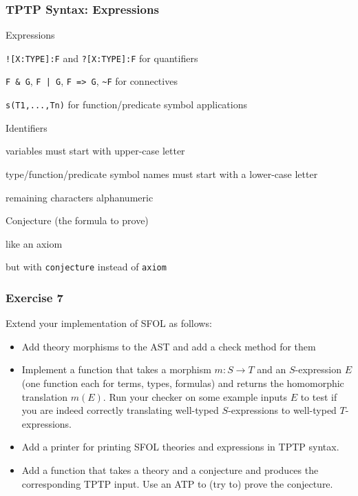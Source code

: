 \begin{frame}[fragile]\frametitle{TPTP Syntax: Expressions}
\begin{blockitems}{Expressions}
\item \lstinline|![X:TYPE]:F| and \lstinline|?[X:TYPE]:F| for quantifiers
\item \lstinline!F & G!, \lstinline!F | G!, \lstinline!F => G!, \lstinline!~F! for connectives
\item \lstinline|s(T1,...,Tn)| for function/predicate symbol applications
\end{blockitems}

\begin{blockitems}{Identifiers}
\item variables must start with upper-case letter
\item type/function/predicate symbol names must start with a lower-case letter
\item remaining characters alphanumeric
\end{blockitems}

\begin{blockitems}{Conjecture (the formula to prove)}
\item like an axiom
\item but with \lstinline|conjecture| instead of \lstinline|axiom|
\end{blockitems}
\end{frame}

\begin{frame}\frametitle{Exercise 7}
Extend your implementation of SFOL as follows:
\begin{itemize}
\item Add theory morphisms to the AST and add a check method for them
\item Implement a function that takes a morphism $m:S\to T$ and an $S$-expression $E$ (one function each for terms, types, formulas) and returns the homomorphic translation $m(E)$.
Run your checker on some example inputs $E$ to test if you are indeed correctly translating well-typed $S$-expressions to well-typed $T$-expressions.
\item Add a printer for printing SFOL theories and expressions in TPTP syntax.
\item Add a function that takes a theory and a conjecture and produces the corresponding TPTP input. Use an ATP to (try to) prove the conjecture.
\end{itemize}
\end{frame}
